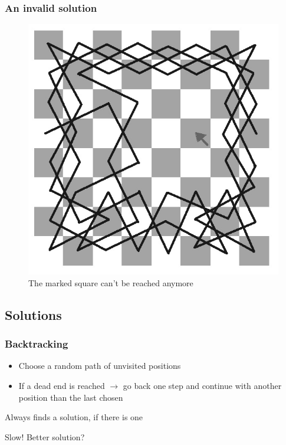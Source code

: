 \documentclass{beamer}
\begin{document}
\begin{frame}
\frametitle{An invalid solution}
\begin{figure}
\includegraphics[scale=0.4]{luecke}
\caption{The marked square can't be reached anymore}
\end{figure}
\end{frame}

\subsection{Solutions}
\begin{frame}
\frametitle{Backtracking}
\begin{itemize}
	\item Choose a random path of unvisited positions
	\item If a dead end is reached $\rightarrow$ go back one step and
	continue with another position than the last chosen 
\end{itemize}
Always finds a solution, if there is one 
 
Slow! Better solution?
\end{frame}
\end{document}
